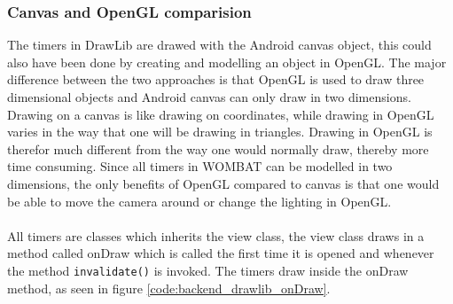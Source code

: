 \subsubsection*{Canvas and OpenGL comparision}
\label{subsection:compare}
The timers in DrawLib are drawed with the Android canvas object, this could also have been done by creating and modelling an object in OpenGL.
The major difference between the two approaches is that OpenGL is used to draw three dimensional objects and Android canvas can only draw in two dimensions.
Drawing on a canvas is like drawing on coordinates, while drawing in OpenGL varies in the way that one will be drawing in triangles.
Drawing in OpenGL is therefor much different from the way one would normally draw, thereby more time consuming.
Since all timers in WOMBAT can be modelled in two dimensions, the only benefits of OpenGL compared to canvas is that one would be able to move the camera around or change the lighting in OpenGL.\\
\\

All timers are classes which inherits the view class, the view class draws in a method called onDraw which is called the first time it is opened and whenever the method \texttt{invalidate()} is invoked.
The timers draw inside the onDraw method, as seen in figure \ref{code:backend_drawlib_onDraw}.


